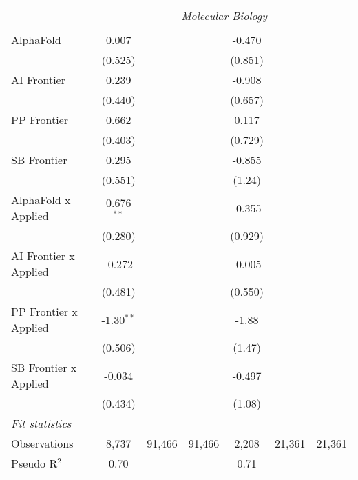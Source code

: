 \begin{tabular}{lcccccc}
 & \multicolumn{6}{c}{\textit{Molecular Biology}} \\ \\
   AlphaFold             & 0.007        &        &        & -0.470  &        &   \\   
                         & (0.525)      &        &        & (0.851) &        &   \\   
   AI Frontier           & 0.239        &        &        & -0.908  &        &   \\   
                         & (0.440)      &        &        & (0.657) &        &   \\   
   PP Frontier           & 0.662        &        &        & 0.117   &        &   \\   
                         & (0.403)      &        &        & (0.729) &        &   \\   
   SB Frontier           & 0.295        &        &        & -0.855  &        &   \\   
                         & (0.551)      &        &        & (1.24)  &        &   \\   
   AlphaFold x Applied   & 0.676$^{**}$ &        &        & -0.355  &        &   \\   
                         & (0.280)      &        &        & (0.929) &        &   \\   
   AI Frontier x Applied & -0.272       &        &        & -0.005  &        &   \\   
                         & (0.481)      &        &        & (0.550) &        &   \\   
   PP Frontier x Applied & -1.30$^{**}$ &        &        & -1.88   &        &   \\   
                         & (0.506)      &        &        & (1.47)  &        &   \\   
   SB Frontier x Applied & -0.034       &        &        & -0.497  &        &   \\   
                         & (0.434)      &        &        & (1.08)  &        &   \\   
   \midrule
   \emph{Fit statistics}\\
   Observations          & 8,737        & 91,466 & 91,466 & 2,208   & 21,361 & 21,361\\  
   Pseudo R$^2$          & 0.70         &        &        & 0.71    &        & \\  
   

\end{tabular}
